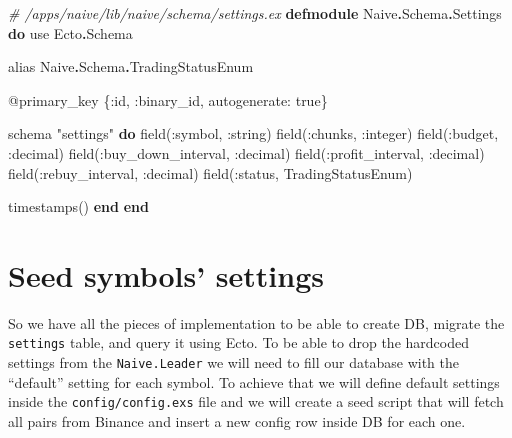 \documentclass[
  oneside]{book}
\newenvironment{Shaded}{\begin{snugshade}}{\end{snugshade}}
\newcommand{\CommentTok}[1]{\textcolor[rgb]{0.56,0.35,0.01}{\textit{#1}}}
\newcommand{\ConstantTok}[1]{\textcolor[rgb]{0.00,0.00,0.00}{#1}}
\newcommand{\ImportTok}[1]{#1}
\newcommand{\KeywordTok}[1]{\textcolor[rgb]{0.13,0.29,0.53}{\textbf{#1}}}
\newcommand{\NormalTok}[1]{#1}
\newcommand{\OperatorTok}[1]{\textcolor[rgb]{0.81,0.36,0.00}{\textbf{#1}}}
\newcommand{\OtherTok}[1]{\textcolor[rgb]{0.56,0.35,0.01}{#1}}
\newcommand{\StringTok}[1]{\textcolor[rgb]{0.31,0.60,0.02}{#1}}
\newcommand{\VariableTok}[1]{\textcolor[rgb]{0.00,0.00,0.00}{#1}}
\begin{document}
\begin{Shaded}
\begin{Highlighting}[]
\CommentTok{\# /apps/naive/lib/naive/schema/settings.ex}
\KeywordTok{defmodule} \ConstantTok{Naive}\OperatorTok{.}\ConstantTok{Schema}\OperatorTok{.}\ConstantTok{Settings} \KeywordTok{do}
  \ImportTok{use} \ConstantTok{Ecto}\OperatorTok{.}\ConstantTok{Schema}

  \ImportTok{alias} \ConstantTok{Naive}\OperatorTok{.}\ConstantTok{Schema}\OperatorTok{.}\ConstantTok{TradingStatusEnum}

  \OtherTok{@primary\_key}\NormalTok{ \{}\VariableTok{:id}\NormalTok{, }\VariableTok{:binary\_id}\NormalTok{, }\VariableTok{autogenerate:} \ConstantTok{true}\NormalTok{\}}

\NormalTok{  schema }\StringTok{"settings"} \KeywordTok{do}
\NormalTok{    field(}\VariableTok{:symbol}\NormalTok{, }\VariableTok{:string}\NormalTok{)}
\NormalTok{    field(}\VariableTok{:chunks}\NormalTok{, }\VariableTok{:integer}\NormalTok{)}
\NormalTok{    field(}\VariableTok{:budget}\NormalTok{, }\VariableTok{:decimal}\NormalTok{)}
\NormalTok{    field(}\VariableTok{:buy\_down\_interval}\NormalTok{, }\VariableTok{:decimal}\NormalTok{)}
\NormalTok{    field(}\VariableTok{:profit\_interval}\NormalTok{, }\VariableTok{:decimal}\NormalTok{)}
\NormalTok{    field(}\VariableTok{:rebuy\_interval}\NormalTok{, }\VariableTok{:decimal}\NormalTok{)}
\NormalTok{    field(}\VariableTok{:status}\NormalTok{, }\ConstantTok{TradingStatusEnum}\NormalTok{)}

\NormalTok{    timestamps()}
  \KeywordTok{end}
\KeywordTok{end}
\end{Highlighting}
\end{Shaded}

\hypertarget{seed-symbols-settings}{%
\section{Seed symbols' settings}\label{seed-symbols-settings}}

So we have all the pieces of implementation to be able to create DB, migrate the \texttt{settings} table, and query it using Ecto. To be able to drop the hardcoded settings from the \texttt{Naive.Leader} we will need to fill our database with the ``default'' setting for each symbol. To achieve that we will define default settings inside the \texttt{config/config.exs} file and we will create a seed script that will fetch all pairs from Binance and insert a new config row inside DB for each one.
\end{document}
